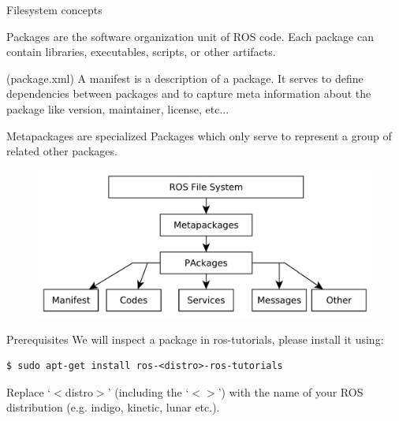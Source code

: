\begin{frame}{Filesystem concepts}
 \begin{description}[leftmargin=10.1cm]
  \item[Packages] Packages are the software organization unit of ROS code. Each package can contain libraries, executables, scripts, or other artifacts. 
  \item[Manifests] (package.xml) A manifest is a description of a package. It serves to define dependencies between packages and to capture meta information about the package like version, maintainer, license, etc...
  \item[Metapackage] Metapackages are specialized Packages which only serve to represent a group of related other packages.
 \end{description}
 
  \begin{figure}
 	\includegraphics[width=.5\textwidth]{./img/ros/RosFilesystem.pdf}
 \end{figure}%
 
 \framebreak
 
 \begin{alertblock}{Prerequisites}
  We will inspect a package in ros-tutorials, please install it using:
\begin{lstlisting}[language=shell]
$ sudo apt-get install ros-<distro>-ros-tutorials
\end{lstlisting}
  Replace `$<$distro$>$' (including the `$<>$') with the name of your ROS distribution (e.g. indigo, kinetic, lunar etc.). 
 \end{alertblock}
\end{frame}

